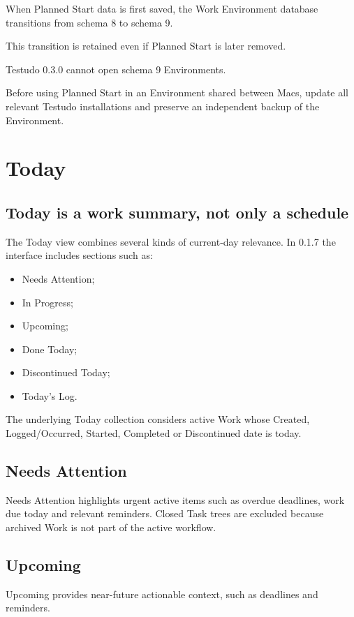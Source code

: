 \documentclass{testudomanual}
\begin{document}
When Planned Start data is first saved, the Work Environment database
transitions from schema 8 to schema 9.

This transition is retained even if Planned Start is later removed.

Testudo 0.3.0 cannot open schema 9 Environments.

Before using Planned Start in an Environment shared between Macs,
update all relevant Testudo installations and preserve an independent
backup of the Environment.

\chapter{Today}

\section{Today is a work summary, not only a schedule}

The Today view combines several kinds of current-day relevance. In 0.1.7 the interface includes sections such as:
\begin{itemize}
    \item Needs Attention;
    \item In Progress;
    \item Upcoming;
    \item Done Today;
    \item Discontinued Today;
    \item Today's Log.
\end{itemize}

The underlying Today collection considers active Work whose Created, Logged/Occurred, Started, Completed or Discontinued date is today.

\section{Needs Attention}

Needs Attention highlights urgent active items such as overdue deadlines, work due today and relevant reminders. Closed Task trees are excluded because archived Work is not part of the active workflow.

\section{Upcoming}

Upcoming provides near-future actionable context, such as deadlines and reminders.
\end{document}

